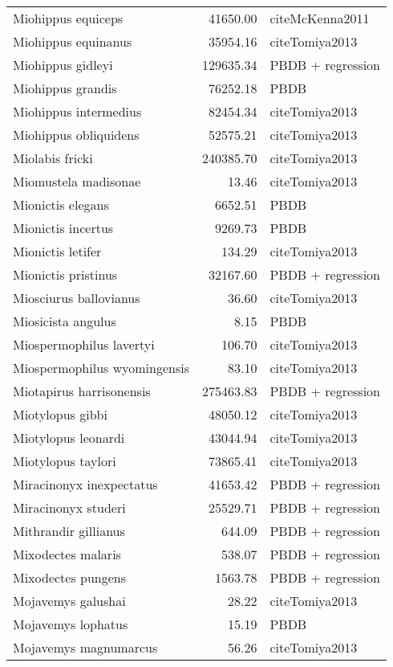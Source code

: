 \begin{table}[ht]
\begin{tabular}{lrl}
  Miohippus equiceps & 41650.00 & cite{McKenna2011} \\ 
  Miohippus equinanus & 35954.16 & cite{Tomiya2013} \\ 
  Miohippus gidleyi & 129635.34 & PBDB + regression \\ 
  Miohippus grandis & 76252.18 & PBDB \\ 
  Miohippus intermedius & 82454.34 & cite{Tomiya2013} \\ 
  Miohippus obliquidens & 52575.21 & cite{Tomiya2013} \\ 
  Miolabis fricki & 240385.70 & cite{Tomiya2013} \\ 
  Miomustela madisonae & 13.46 & cite{Tomiya2013} \\ 
  Mionictis elegans & 6652.51 & PBDB \\ 
  Mionictis incertus & 9269.73 & PBDB \\ 
  Mionictis letifer & 134.29 & cite{Tomiya2013} \\ 
  Mionictis pristinus & 32167.60 & PBDB + regression \\ 
  Miosciurus ballovianus & 36.60 & cite{Tomiya2013} \\ 
  Miosicista angulus & 8.15 & PBDB \\ 
  Miospermophilus lavertyi & 106.70 & cite{Tomiya2013} \\ 
  Miospermophilus wyomingensis & 83.10 & cite{Tomiya2013} \\ 
  Miotapirus harrisonensis & 275463.83 & PBDB + regression \\ 
  Miotylopus gibbi & 48050.12 & cite{Tomiya2013} \\ 
  Miotylopus leonardi & 43044.94 & cite{Tomiya2013} \\ 
  Miotylopus taylori & 73865.41 & cite{Tomiya2013} \\ 
  Miracinonyx inexpectatus & 41653.42 & PBDB + regression \\ 
  Miracinonyx studeri & 25529.71 & PBDB + regression \\ 
  Mithrandir gillianus & 644.09 & PBDB + regression \\ 
  Mixodectes malaris & 538.07 & PBDB + regression \\ 
  Mixodectes pungens & 1563.78 & PBDB + regression \\ 
  Mojavemys galushai & 28.22 & cite{Tomiya2013} \\ 
  Mojavemys lophatus & 15.19 & PBDB \\ 
  Mojavemys magnumarcus & 56.26 & cite{Tomiya2013} \\ 

\end{tabular}
\end{table}
